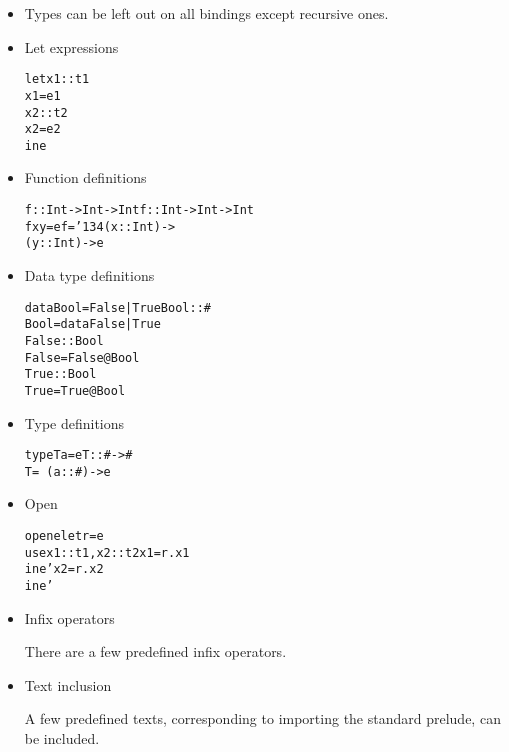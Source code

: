 \documentclass[17pt]{foils} %
\newcommand\bs{\char '134}  %
\begin{document}
\newpage
{}
\begin{itemize}
\item Types can be left out on all bindings except recursive ones.

\item Let expressions
\begin{alltt}
let x1 :: t1
    x1 = e1
    x2 :: t2
    x2 = e2
in  e

\end{alltt}

\item Function definitions
\begin{alltt}
f :: Int -> Int -> Int     f :: Int -> Int -> Int
f x y = e                  f = \bs (x::Int) -> 
                                 (y::Int) -> e

\end{alltt}

\item Data type definitions
\begin{alltt}
data Bool = False | True   Bool :: #
                           Bool = data False | True
                           False :: Bool
                           False = False@Bool
                           True :: Bool
                           True = True@Bool

\end{alltt}

\newpage
\item Type definitions
\begin{alltt}
type T a = e               T :: # -> #
                           T = \ (a :: #) -> e

\end{alltt}

\item Open
\begin{alltt}
open e                     let r = e
use  x1::t1,x2::t2             x1 = r.x1
in   e'                        x2 = r.x2
                           in  e'
\end{alltt}

\item Infix operators

There are a few predefined infix operators.

\item Text inclusion

A few predefined texts, corresponding to importing the
standard prelude, can be included.

\end{itemize}
\end{document}
